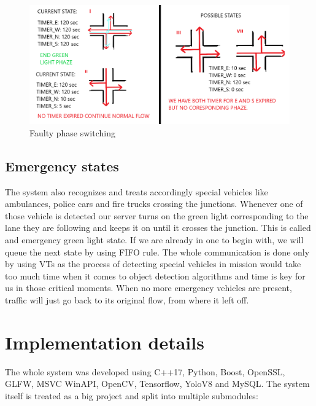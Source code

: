 \documentclass[17pt]{report}
\begin{document}
\begin{figure}[h!]
    \includegraphics[width=\textwidth]{Sketches/phaseSwitchingCaseToBeAvoided.png}
    \caption{Faulty phase switching}
    \label{fig:FaultyphaseSwitching}
\end{figure}

\section{Emergency states}
\indent \indent
The system also recognizes and treats accordingly
special vehicles like ambulances, police cars and fire trucks
crossing the junctions. Whenever one of those vehicle is detected
our server turns on the green light corresponding to the lane they are
following and keeps it on until it crosses the junction. This is called 
and emergency green light state. If we are already
in one to begin with, we will queue the next state by using FIFO rule.
The whole communication is done only by using VTs as the process of detecting 
special vehicles in mission would take too much time when it comes to object 
detection algorithms and time is key for us in those critical moments.
When no more emergency vehicles are present, traffic will just go 
back to its original flow, from where it left off.

\pagebreak



\chapter{Implementation details}
\indent \indent
The whole system was developed using C++17, Python, Boost, OpenSSL, GLFW,
MSVC WinAPI, OpenCV, Tensorflow, YoloV8 and MySQL. The system itself is
treated as a big project and split into multiple submodules: 
\end{document}
